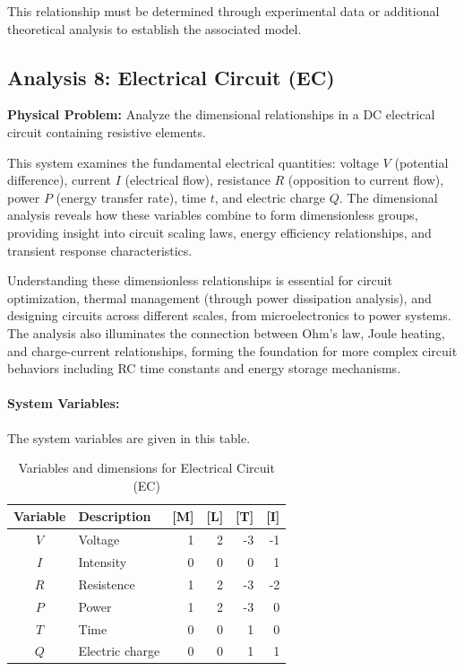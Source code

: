                     This relationship must be determined through experimental data or additional theoretical analysis to establish the associated model.


\subsection{Analysis 8: Electrical Circuit (EC)}
\label{sec:Electrical_Circuit_EC}

\begin{problembox}
\textbf{Physical Problem:} Analyze the dimensional relationships in a DC electrical circuit containing resistive elements.
\end{problembox}

This system examines the fundamental electrical quantities: voltage $V$ (potential difference), current $I$ (electrical flow), resistance $R$ (opposition to current flow), power $P$ (energy transfer rate), time $t$, and electric charge $Q$. The dimensional analysis reveals how these variables combine to form dimensionless groups, providing insight into circuit scaling laws, energy efficiency relationships, and transient response characteristics.



Understanding these dimensionless relationships is essential for circuit optimization, thermal management (through power dissipation analysis), and designing circuits across different scales, from microelectronics to power systems. The analysis also illuminates the connection between Ohm's law, Joule heating, and charge-current relationships, forming the foundation for more complex circuit behaviors including RC time constants and energy storage mechanisms.

\paragraph{System Variables: } The system variables are given in this table.

\begin{table}[H]
\centering
\begin{tabular}{|c|l|r|r|r|r|}
\hline
\textbf{Variable} & \textbf{Description} & \textbf{[M]} & \textbf{[L]} & \textbf{[T]} & \textbf{[I]} \\
\hline
$V$ & Voltage & 1 & 2 & -3 & -1 \\
$I$ & Intensity & 0 & 0 & 0 & 1 \\
$R$ & Resistence & 1 & 2 & -3 & -2 \\
$P$ & Power & 1 & 2 & -3 & 0 \\
$T$ & Time & 0 & 0 & 1 & 0 \\
$Q$ & Electric charge & 0 & 0 & 1 & 1 \\

\hline
\end{tabular}
\caption{Variables and dimensions for Electrical Circuit (EC)}
\end{table}


